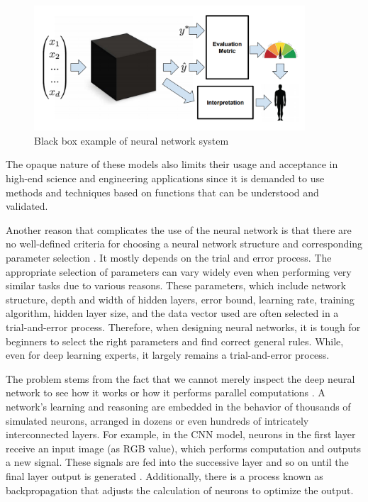 \begin{figure}[htbp]
\centering
\includegraphics[width=0.90\textwidth]{images/Black-box.png}
\caption{Black box example of neural network system}
\label{fig:blackbox}
\end{figure}

The opaque nature of these models also limits their usage and acceptance in high-end science and engineering applications since it is demanded to use methods and techniques based on functions that can be understood and validated. 

Another reason that complicates the use of the neural network is that there are no well-defined criteria for choosing a neural network structure and corresponding parameter selection \cite{dlvwz}. It mostly depends on the trial and error process. The appropriate selection of parameters can vary widely even when performing very similar tasks due to various reasons. These parameters, which include network structure, depth and width of hidden layers, error bound, learning rate, training algorithm, hidden layer size, and the data vector used are often selected in a trial-and-error process. Therefore, when designing neural networks, it is tough for beginners to select the right parameters and find correct general rules. While, even for deep learning experts, it largely remains a trial-and-error process. 

The problem stems from the fact that we cannot merely inspect the deep neural network to see how it works or how it performs parallel computations \cite{darksecretaimittr}. A network’s learning and reasoning are embedded in the behavior of thousands of simulated neurons, arranged in dozens or even hundreds of intricately interconnected layers. For example, in the CNN model, neurons in the first layer receive an input image (as RGB value), which performs computation and outputs a new signal. These signals are fed into the successive layer and so on until the final layer output is generated \cite{darksecretaimittr}. Additionally, there is a process known as backpropagation that adjusts the calculation of neurons to optimize the output.

